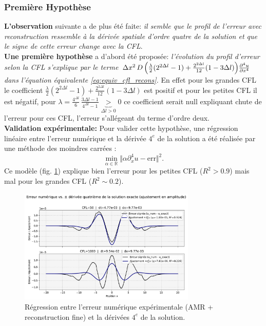 \subsubsection{Première Hypothèse}
\textbf{L'observation} suivante a de plus été faite: \textit{il semble que le profil de l'erreur avec reconstruction ressemble à la dérivée spatiale d'ordre quatre
de la solution et que le signe de cette erreur change avec la CFL}.\\
\textbf{Une première hypothèse} a d'abord été proposée: \textit{l'évolution du profil d'erreur selon la CFL s'explique par le terme $\Delta x^{2}\, D \, \Bigl( 
        \frac{\lambda}{2} (2^{2 \Delta l} - 1) + \frac{2^{2 \Delta l} }{12} (1 - 3 \Delta l)
        \Bigr)\frac{\partial^{4}u}{\partial x^{4}}$ dans l'équation équivalente \eqref{eq:equiv_cfl_recons}.}
En effet pour les grandes CFL le coefficient $\frac{\lambda}{2} (2^{2 \Delta l} - 1) + \frac{2^{2 \Delta l} }{12} (1 - 3 \Delta l)$ est positif et pour les petites CFL il est négatif, pour $\lambda = \frac{4^{\Delta l}}{6}\,\frac{3 \Delta l - 1 }{4^{\Delta l}-1} \underbrace{>}_{\Delta l >0} 0$ ce coefficient serait null expliquant 
chute de l'erreur pour ces CFL, l'erreur s'allégeant du terme d'ordre deux.\\
\textbf{Validation expérimentale:} Pour valider cette hypothèse, une régression linéaire entre l'erreur numérique et la dérivée $4^e$ de la solution a été réalisée par 
une méthode des moindres carrées : $$\min_{\alpha \in \mathbb R} \Vert \alpha \partial_x^4 u - \text{err} \Vert^2.$$
Ce modèle (fig. \ref{fig:derive4_vs_err}) explique bien l'erreur pour les petites CFL ($R^2>0.9$) mais mal pour les grandes CFL ($R^2 \sim 0.2$).
\begin{figure}[htpb]
    \centering
    \includegraphics[width=0.75\textwidth]{media/4_travail/3/erreur_vs_deriv4.pdf}
    \caption{Régression entre l'erreur numérique expérimentale (AMR + reconstruction fine) et la dérivées $4^e$ de la solution.}
    \label{fig:derive4_vs_err}
\end{figure}
\newpage
